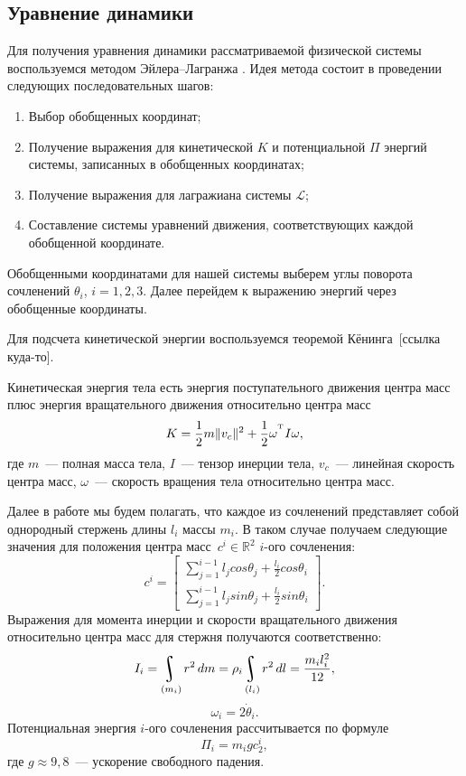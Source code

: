 \documentclass[../../doc.tex]{subfiles}
\begin{document}
    \subsection{Уравнение динамики}

    Для получения уравнения динамики рассматриваемой физической системы воспользуемся методом Эйлера--Лагранжа \cite{kolubin2017}.
    Идея метода состоит в проведении следующих последовательных шагов:
    \begin{enumerate}\itemsep0em 
        \item Выбор обобщенных координат;
        \item Получение выражения для кинетической $K$ и потенциальной $\Pi$ энергий системы, записанных в обобщенных координатах;
        \item Получение выражения для лагражиана системы $\mathcal{L}$;
        \item Составление системы уравнений движения, соответствующих каждой обобщенной координате.
    \end{enumerate}

    Обобщенными координатами для нашей системы выберем углы поворота сочленений $\theta_i$, $i = 1, 2, 3$.
    Далее перейдем к выражению энергий через обобщенные координаты.

    Для подсчета кинетической энергии воспользуемся теоремой Кёнинга~[ссылка куда-то].
    \begin{theorem}[Кёнинг]
        Кинетическая энергия тела есть энергия поступательного движения центра масс плюс энергия вращательного движения относительно центра масс
        \begin{equation}\label{eq:kin-energy}
            K = \frac{1}{2} m \|v_c\|^2 + \frac{1}{2}\omega^{^\textnormal{T}} I \omega,
        \end{equation}
        где $m$~--- полная масса тела, $I$~--- тензор инерции тела, $v_c$~--- линейная скорость центра масс, $\omega$~--- скорость вращения тела относительно центра масс.
    \end{theorem}

    Далее в работе мы будем полагать, что каждое из сочленений представляет собой однородный стержень длины $l_i$ массы $m_i$.
    В таком случае получаем следующие значения для положения центра масс~$c^i \in \mathbb{R}^2$ $i$-ого сочленения:
    $$
        c^i =
        \left[\begin{aligned}
            \sum_{j=1}^{i-1} l_j cos\theta_j + \frac{l_i}{2}cos\theta_i \\
            \sum_{j=1}^{i-1} l_j sin\theta_j + \frac{l_i}{2}sin\theta_i
        \end{aligned}\right].
    $$
    Выражения для момента инерции и скорости вращательного движения относительно центра масс для стержня получаются соответственно:
    $$
        I_i = \uint\limits_{(m_i)} r^2\,dm = \rho_i\uint\limits_{(l_i)} r^2\,dl = \frac{m_il_i^2}{12},
    $$
    $$
        \omega_i = 2\dot \theta_i.
    $$
    Потенциальная энергия $i$-ого сочленения рассчитывается по формуле
    $$
        \Pi_i = m_i g c^i_2,
    $$
    где $g \approx 9,\!8$~--- ускорение свободного падения.
\end{document}
